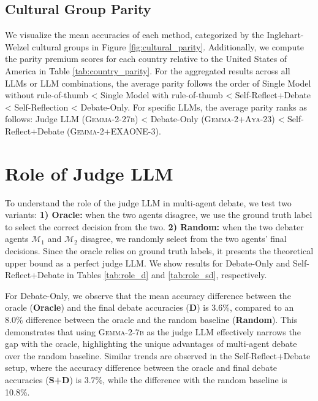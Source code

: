 \documentclass[11pt]{article}
\begin{document}






\subsection{Cultural Group Parity}
\label{appendix:country_parity}
We visualize the mean accuracies of each method, categorized by the Inglehart-Welzel cultural groups in Figure \ref{fig:cultural_parity}. Additionally, we compute the parity premium scores for each country relative to the United States of America in Table \ref{tab:country_parity}. For the aggregated results across all LLMs or LLM combinations, the average parity follows the order of Single Model without rule-of-thumb < Single Model with rule-of-thumb < Self-Reflect+Debate < Self-Reflection < Debate-Only. For specific LLMs, the average parity ranks as follows: Judge LLM (\textsc{Gemma-2-27b}) < Debate-Only (\textsc{Gemma-2}+\textsc{Aya-23}) < Self-Reflect+Debate (\textsc{Gemma-2}+\textsc{EXAONE-3}).



\section{Role of Judge LLM}
\label{appendix:role_judge_llm}
To understand the role of the judge LLM in multi-agent debate, we test two variants: \textbf{1) Oracle:} when the two agents disagree, we use the ground truth label to select the correct decision from the two. \textbf{2) Random:} when the two debater agents $\mathcal{M}_1$ and $\mathcal{M}_2$ disagree, we randomly select from the two agents' final decisions. Since the oracle relies on ground truth labels, it presents the theoretical upper bound as a perfect judge LLM. We show results for Debate-Only and Self-Reflect+Debate in Tables \ref{tab:role_d} and \ref{tab:role_sd}, respectively. 

For Debate-Only, we observe that the mean accuracy difference between the oracle (\textbf{Oracle}) and the final debate accuracies (\textbf{D}) is 3.6\%, compared to an 8.0\% difference between the oracle and the random baseline (\textbf{Random}). This demonstrates that using \textsc{Gemma-2-7b} as the judge LLM effectively narrows the gap with the oracle, highlighting the unique advantages of multi-agent debate over the random baseline. Similar trends are observed in the Self-Reflect+Debate setup, where the accuracy difference between the oracle and final debate accuracies (\textbf{S+D}) is 3.7\%, while the difference with the random baseline is 10.8\%. 
\end{document}
